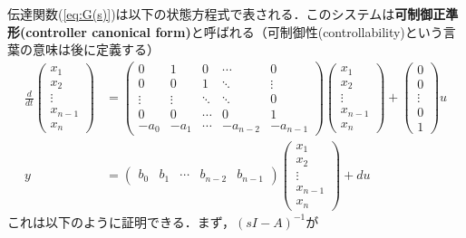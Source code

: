 伝達関数(\ref{eq:G(s)})は以下の状態方程式で表される．このシステムは{\bf {可制御正準形}(controller canonical form)}と呼ばれる（可制御性(controllability)という言葉の意味は後に定義する）
\begin{align}
 \frac{d}{dt}
  \left(\begin{array}{c}
         x_1 \\
	 x_2 \\
	 \vdots \\
	 x_{n-1} \\
	 x_n
	\end{array}\right)
  &=
  \left(\begin{array}{ccccc}
     0      & 1      & 0      & \cdots & 0 \\
	 0      & 0      & 1      & \ddots & \vdots \\
	 \vdots & \vdots & \ddots & \ddots & 0 \\
	 0      & 0      & \cdots & 0      & 1 \\
	 -a_0   & -a_1   & \cdots & -a_{n-2} & -a_{n-1}
	\end{array}\right)
  \left(\begin{array}{c}
	 x_1 \\
	 x_2 \\
	 \vdots \\
	 x_{n-1} \\
	 x_n
	\end{array}\right)
  +
  \left(\begin{array}{c}
         0 \\
	 0 \\
	 \vdots \\
	 0 \\
	 1
	\end{array}\right)
  u \label{eq:canoform}\\
y &=
 \left(\begin{array}{ccccc}
        b_0 & b_1 & \cdots & b_{n-2} & b_{n-1}
       \end{array}\right)
 \left(\begin{array}{c}
        x_1 \\
	x_2 \\
	\vdots \\
	x_{n-1} \\
	x_n
       \end{array}\right)
 + d u
\end{align}
これは以下のように証明できる．まず，$(sI-A)^{-1}$が
